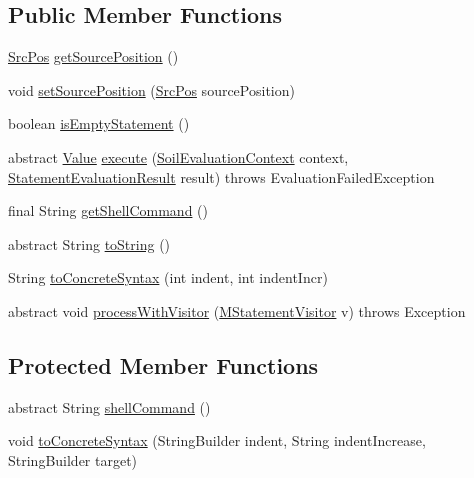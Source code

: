\subsection*{Public Member Functions}
\begin{DoxyCompactItemize}
\item 
\hyperlink{classorg_1_1tzi_1_1use_1_1parser_1_1_src_pos}{Src\-Pos} \hyperlink{classorg_1_1tzi_1_1use_1_1uml_1_1sys_1_1soil_1_1_m_statement_a32fcd00b9276e125771b3b4220a7fa5e}{get\-Source\-Position} ()
\item 
void \hyperlink{classorg_1_1tzi_1_1use_1_1uml_1_1sys_1_1soil_1_1_m_statement_a38905f23b96569a5c495406ece65fd85}{set\-Source\-Position} (\hyperlink{classorg_1_1tzi_1_1use_1_1parser_1_1_src_pos}{Src\-Pos} source\-Position)
\item 
boolean \hyperlink{classorg_1_1tzi_1_1use_1_1uml_1_1sys_1_1soil_1_1_m_statement_ac0bd4739bac373d5f27c5fe28f257326}{is\-Empty\-Statement} ()
\item 
abstract \hyperlink{classorg_1_1tzi_1_1use_1_1uml_1_1ocl_1_1value_1_1_value}{Value} \hyperlink{classorg_1_1tzi_1_1use_1_1uml_1_1sys_1_1soil_1_1_m_statement_a9a19ec8e169169d1b00e8b20c66e4c65}{execute} (\hyperlink{classorg_1_1tzi_1_1use_1_1uml_1_1sys_1_1soil_1_1_soil_evaluation_context}{Soil\-Evaluation\-Context} context, \hyperlink{classorg_1_1tzi_1_1use_1_1uml_1_1sys_1_1_statement_evaluation_result}{Statement\-Evaluation\-Result} result)  throws Evaluation\-Failed\-Exception
\item 
final String \hyperlink{classorg_1_1tzi_1_1use_1_1uml_1_1sys_1_1soil_1_1_m_statement_a333b37a89c922332cd271681a0785a29}{get\-Shell\-Command} ()
\item 
abstract String \hyperlink{classorg_1_1tzi_1_1use_1_1uml_1_1sys_1_1soil_1_1_m_statement_ab6b5de3fe7a5b877234cfdd8d3b7f26d}{to\-String} ()
\item 
String \hyperlink{classorg_1_1tzi_1_1use_1_1uml_1_1sys_1_1soil_1_1_m_statement_a348cc960b94875bf23f9d14137aaab81}{to\-Concrete\-Syntax} (int indent, int indent\-Incr)
\item 
abstract void \hyperlink{classorg_1_1tzi_1_1use_1_1uml_1_1sys_1_1soil_1_1_m_statement_a5d8926053bcd54109936779aab0b8452}{process\-With\-Visitor} (\hyperlink{interfaceorg_1_1tzi_1_1use_1_1uml_1_1sys_1_1soil_1_1_m_statement_visitor}{M\-Statement\-Visitor} v)  throws Exception
\end{DoxyCompactItemize}
\subsection*{Protected Member Functions}
\begin{DoxyCompactItemize}
\item 
abstract String \hyperlink{classorg_1_1tzi_1_1use_1_1uml_1_1sys_1_1soil_1_1_m_statement_ab1898a38075adaf4a0b8c826a78552bd}{shell\-Command} ()
\item 
void \hyperlink{classorg_1_1tzi_1_1use_1_1uml_1_1sys_1_1soil_1_1_m_statement_a9f5f5820ac9df3c7cc513cab1600c225}{to\-Concrete\-Syntax} (String\-Builder indent, String indent\-Increase, String\-Builder target)
\end{DoxyCompactItemize}


